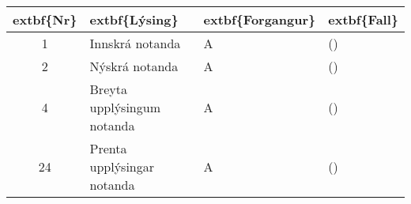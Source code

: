 \documentclass[a4paper]{article}
\begin{document}
\begin{tabular}{|c|p{10cm}|l|l|}
\hline
	extbf\{Nr\}&	extbf\{Lýsing\}&	extbf\{Forgangur\}&	extbf\{Fall\}\\
\hline
1&Innskrá notanda&A &()\\
\hline
2&Nýskrá notanda&A &()\\
\hline
4&Breyta upplýsingum notanda&A &()\\
\hline
24&Prenta upplýsingar notanda&A &()\\
\hline
\end{tabular}
\end{document}
